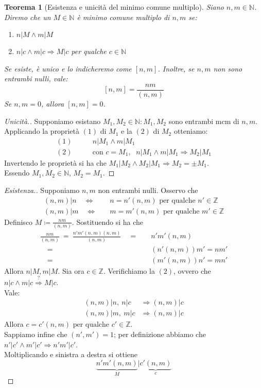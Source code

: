 \documentclass[12pt]{article}
\newcommand{\N}{\mathbb{N}}
\newcommand{\Z}{\mathbb{Z}}
\newcommand{\sesolose}{\Leftrightarrow}
\newcommand{\implica}{\Longrightarrow}
\newcommand{\pq}{\text{ per qualche }}
\renewcommand\qedsymbol{$\blacksquare$}
\newtheorem{theorem}{Teorema}
\begin{document}
\begin{theorem}[Esistenza e unicità del minimo comune multiplo]
	Siano $n, m \in \N$. Diremo che un $M \in \N$ è minimo comune multiplo di $n, m$ se:
	\begin{enumerate}
		\item$n | M \land m | M $
		\item$n | c \land m | c \implica M | c$ per qualche $c \in \N$
	\end{enumerate}
	Se esiste, è unico e lo indicheremo come $[n, m]$. Inoltre, se $n, m$ non sono entrambi nulli, vale:
	$$[n, m] = \frac{nm}{(n, m)}$$
	Se $n, m = 0$, allora $ [n, m] = 0$.
\end{theorem}

\renewcommand\qedsymbol{$\square$}
\begin{proof}[Unicità.]
	Supponiamo esistano $M_1, M_2 \in \N : M_1, M_2$ sono entrambi mcm di $n, m$.
	Applicando la proprietà $(1)$ di $M_1$ e la $(2)$ di $M_2$ otteniamo:
	\begin{align*}
		(1)\qquad & n | M_1 \land m | M_1                                                      \\
		(2)\qquad & \text{con } c = M_1 \text{, } \ \ n | M_1 \land m | M_1 \implica M_2 | M_1
	\end{align*}
	Invertendo le proprietà si ha che $M_1 | M_2 \land M_2 | M_1 \implica M_2 = \pm M_1$.
	\\Essendo $M_1, M_2 \in \N$, $M_2 = M_1$.
\end{proof}


\renewcommand\qedsymbol{$\blacksquare$}
\begin{proof}[Esistenza.]
	Supponiamo $n, m$ non entrambi nulli. Osservo che
	\begin{align*}
		(n, m)|n \quad\sesolose & \quad n = n'(n,m) \pq n'\in\Z \\
		(n, m)|m \quad\sesolose & \quad m = m'(n,m) \pq m'\in\Z
	\end{align*}
	Definisco $\displaystyle M \coloneqq \frac{nm}{(n, m)}$. Sostituendo si ha che
	\begin{align*}
		\frac{nm}{(n, m)}\ = \ \frac{n'm'(n, m)(n, m)}{(n, m)} \quad= & \quad n'm'(n,m)          \\
		\quad=                                                        & \quad (n'(n, m))m' = nm' \\
		\quad=                                                        & \quad (m'(n,m))n' = mn'
	\end{align*}
	Allora $n | M, m | M$. Sia ora $c \in \Z$. Verifichiamo la $(2)$, ovvero che $n | c \land m | c \stackrel{?}{\implica} M | c$.
	\\ Vale:
	\begin{align*}
		(n, m) | n,\ n|c & \implica (n,m)|c \\
		(n, m) | m,\ m|c & \implica (n,m)|c
	\end{align*}
	Allora $c = c'(n, m) \pq c' \in \Z$.
	\\Sappiamo infine che $(n', m') = 1$; per definizione abbiamo che $n' | c' \land m' | c' \implica n'm' | c'$.
	\\Moltiplicando e sinistra a destra si ottiene
	$$ \underbrace{n'm'(n,m)}_M | \underbrace{c'(n,m)}_c$$
\end{proof}
\end{document}

